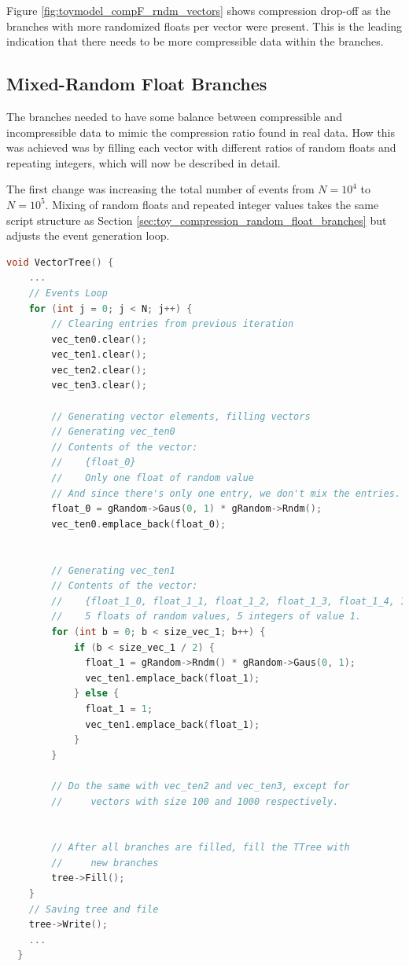 Figure \ref{fig:toymodel_compF_rndm_vectors} shows compression drop-off as the branches with more randomized floats per vector were present.
This is the leading indication that there needs to be more compressible data within the branches. 

\subsection{Mixed-Random Float Branches}
The branches needed to have some balance between compressible and incompressible data to mimic the compression ratio found in real data.
How this was achieved was by filling each vector with different ratios of random floats and repeating integers, which will now be described in detail.

The first change was increasing the total number of events from $N = 10^4$ to $N = 10^5$. 
Mixing of random floats and repeated integer values takes the same script structure as Section \ref{sec:toy_compression_random_float_branches} but adjusts the event generation loop.
\begin{lstlisting}[language=C]  
  void VectorTree() {
    ...
    // Events Loop
    for (int j = 0; j < N; j++) {
        // Clearing entries from previous iteration
        vec_ten0.clear();
        vec_ten1.clear();
        vec_ten2.clear();
        vec_ten3.clear();

        // Generating vector elements, filling vectors
        // Generating vec_ten0
        // Contents of the vector:
        //    {float_0}
        //    Only one float of random value
        // And since there's only one entry, we don't mix the entries. 
        float_0 = gRandom->Gaus(0, 1) * gRandom->Rndm();
        vec_ten0.emplace_back(float_0);
        

        // Generating vec_ten1
        // Contents of the vector:
        //    {float_1_0, float_1_1, float_1_2, float_1_3, float_1_4, 1, 1, 1, 1, 1}
        //    5 floats of random values, 5 integers of value 1.
        for (int b = 0; b < size_vec_1; b++) {
            if (b < size_vec_1 / 2) {
              float_1 = gRandom->Rndm() * gRandom->Gaus(0, 1);
              vec_ten1.emplace_back(float_1);
            } else {
              float_1 = 1;
              vec_ten1.emplace_back(float_1);
            }
        }

        // Do the same with vec_ten2 and vec_ten3, except for 
        //     vectors with size 100 and 1000 respectively. 


        // After all branches are filled, fill the TTree with 
        //     new branches
        tree->Fill(); 
    }
    // Saving tree and file
    tree->Write();
    ...
  }
\end{lstlisting}

